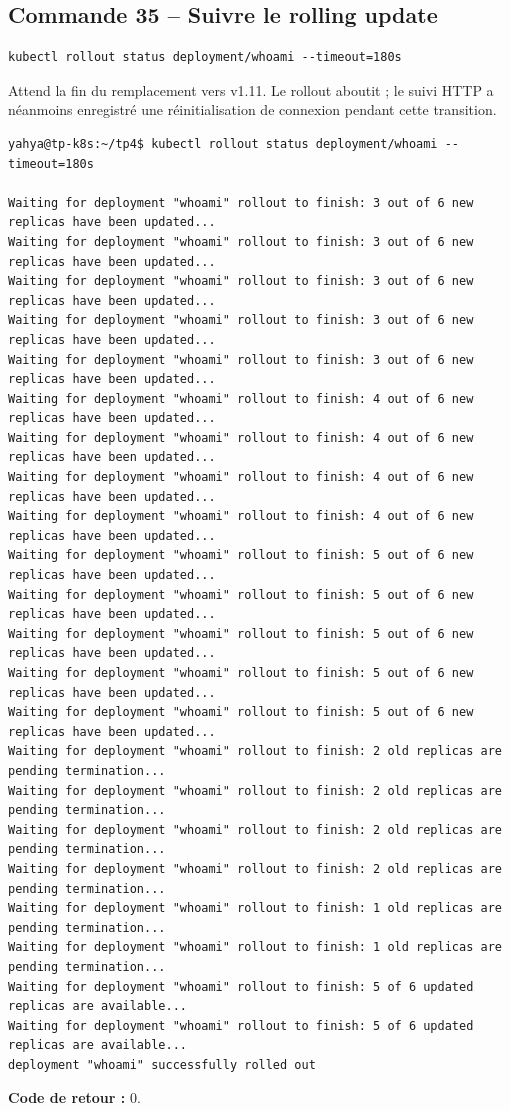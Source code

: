 \documentclass[11pt,a4paper]{article}
\begin{document}
\subsection{Commande 35 -- Suivre le rolling update}
\begin{lstlisting}
kubectl rollout status deployment/whoami --timeout=180s
\end{lstlisting}
Attend la fin du remplacement vers v1.11. Le rollout aboutit ; le suivi HTTP a néanmoins enregistré une réinitialisation de connexion pendant cette transition.
\begin{tcolorbox}[terminal,title={Ubuntu / WSL2 -- Commande 35 -- rendu reconstitué}]
\begin{Verbatim}[fontsize=\scriptsize,breaklines=true,breakanywhere=true,breaksymbolleft={},breaksymbolright={}]
yahya@tp-k8s:~/tp4$ kubectl rollout status deployment/whoami --timeout=180s

Waiting for deployment "whoami" rollout to finish: 3 out of 6 new replicas have been updated...
Waiting for deployment "whoami" rollout to finish: 3 out of 6 new replicas have been updated...
Waiting for deployment "whoami" rollout to finish: 3 out of 6 new replicas have been updated...
Waiting for deployment "whoami" rollout to finish: 3 out of 6 new replicas have been updated...
Waiting for deployment "whoami" rollout to finish: 3 out of 6 new replicas have been updated...
Waiting for deployment "whoami" rollout to finish: 4 out of 6 new replicas have been updated...
Waiting for deployment "whoami" rollout to finish: 4 out of 6 new replicas have been updated...
Waiting for deployment "whoami" rollout to finish: 4 out of 6 new replicas have been updated...
Waiting for deployment "whoami" rollout to finish: 4 out of 6 new replicas have been updated...
Waiting for deployment "whoami" rollout to finish: 5 out of 6 new replicas have been updated...
Waiting for deployment "whoami" rollout to finish: 5 out of 6 new replicas have been updated...
Waiting for deployment "whoami" rollout to finish: 5 out of 6 new replicas have been updated...
Waiting for deployment "whoami" rollout to finish: 5 out of 6 new replicas have been updated...
Waiting for deployment "whoami" rollout to finish: 5 out of 6 new replicas have been updated...
Waiting for deployment "whoami" rollout to finish: 2 old replicas are pending termination...
Waiting for deployment "whoami" rollout to finish: 2 old replicas are pending termination...
Waiting for deployment "whoami" rollout to finish: 2 old replicas are pending termination...
Waiting for deployment "whoami" rollout to finish: 2 old replicas are pending termination...
Waiting for deployment "whoami" rollout to finish: 1 old replicas are pending termination...
Waiting for deployment "whoami" rollout to finish: 1 old replicas are pending termination...
Waiting for deployment "whoami" rollout to finish: 5 of 6 updated replicas are available...
Waiting for deployment "whoami" rollout to finish: 5 of 6 updated replicas are available...
deployment "whoami" successfully rolled out
\end{Verbatim}
\end{tcolorbox}
\textbf{Code de retour :} 0.
\end{document}
